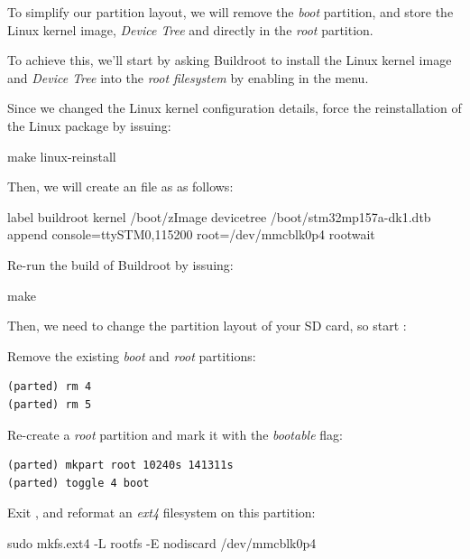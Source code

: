 To simplify our partition layout, we will remove the {\em boot}
partition, and store the Linux kernel image, {\em Device Tree} and
 directly in the {\em root} partition.

To achieve this, we'll start by asking Buildroot to install the Linux
kernel image and {\em Device Tree} into the {\em root filesystem} by
enabling  in the
 menu.

Since we changed the Linux kernel configuration details, force the
reinstallation of the Linux package by issuing:

\begin{bashinput}
make linux-reinstall
\end{bashinput}

Then, we will create an  file as
as follows:

{\small
\begin{fileinput}
label buildroot
  kernel /boot/zImage
  devicetree /boot/stm32mp157a-dk1.dtb
  append console=ttySTM0,115200 root=/dev/mmcblk0p4 rootwait
\end{fileinput}
}

Re-run the build of Buildroot by issuing:

\begin{bashinput}
make
\end{bashinput}

Then, we need to change the partition layout of your SD card, so start
:


Remove the existing {\em boot} and {\em root} partitions:

\begin{verbatim}
(parted) rm 4
(parted) rm 5
\end{verbatim}

Re-create a {\em root} partition and mark it with the {\em bootable}
flag:

\begin{verbatim}
(parted) mkpart root 10240s 141311s
(parted) toggle 4 boot
\end{verbatim}

Exit , and reformat an {\em ext4} filesystem on this
partition:

\begin{bashinput}
sudo mkfs.ext4 -L rootfs -E nodiscard /dev/mmcblk0p4
\end{bashinput}


